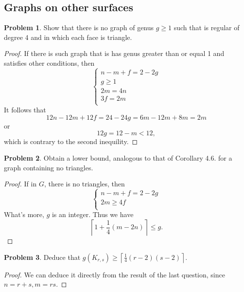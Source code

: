 \documentclass[a4paper,11pt]{article}%
\theoremstyle{remark}
\theoremstyle{definition}
\newtheorem{problem}{Problem}[subsection]
\begin{document}
\subsection{Graphs on other surfaces}
\begin{problem}
    Show that there is no graph of genus $g\geq 1$ such that is regular of degree 4 and in which each face is triangle. 
    \begin{proof}
        If there is such graph that is has genus greater than or equal 1 and satisfies other conditions, then 
        \[
        \begin{cases}
            n-m+f=2-2g\\
            g\geq 1\\
            2m=4n\\
            3f=2m\\
        \end{cases}
        \]
        It follows that 
        \[12n-12m+12f=24-24g=6m-12m+8m=2m\]
        or 
        \[12g=12-m< 12,\]
        which is contrary to the second inequility. 
    \end{proof}
\end{problem}
\begin{problem}
    Obtain a lower bound, analogous to that of Corollary 4.6. for a graph containing no triangles.
    \begin{proof}
        If in $G$, there is no triangles, then 
        \[\begin{cases}
           n-m+f=2-2g\\
           2m\geq 4f\\ 
        \end{cases}\]
        What's more, $g$ is an integer. Thus we have 
        \[\left\lceil 1+\frac{1}{4}(m-2n)\right\rceil \leq g.\]
    \end{proof}
\end{problem}
\begin{problem}
    Deduce that $g(K_{r,s})\geq\left\lceil \frac{1}{4}(r-2)(s-2)\right\rceil $.
    \begin{proof}
       We can deduce it directly from the result of the last question, since $n=r+s,m=rs$. 
    \end{proof}
\end{problem}
\end{document}
